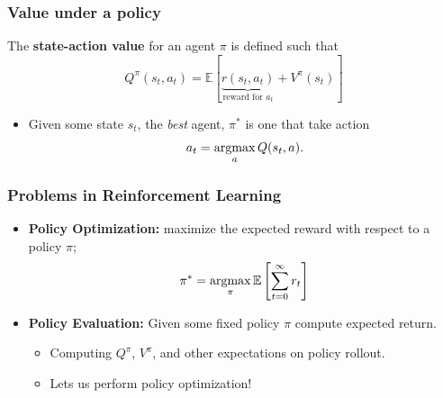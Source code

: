 \begin{frame}
\frametitle{Value under a policy}
  The \textbf{state-action value} for an agent $\pi$ is defined such that
  \begin{equation*}
    Q^\pi(s_t, a_t) = \mathbb{E}\left[\underbrace{r(s_t, a_t)}_{\text{reward for } a_t} + V^\pi(s_t)\right]
  \end{equation*}
  \begin{itemize}
    \item Given some state $s_t$, the \emph{best} agent, $\pi^*$ is one that take action 
  \begin{equation*}
    a_t = \mathop{\mathrm{argmax}}_a Q(s_t, a).   
  \end{equation*}
  \end{itemize}
\end{frame}

\begin{frame}
  \frametitle{Problems in Reinforcement Learning}
  \begin{itemize}
    \item \textbf{Policy Optimization:} maximize the expected reward with respect to a policy $\pi$;
    \begin{equation*}
      \pi^* = \mathop{\mathrm{argmax}}_\pi \mathbb{E}\left[\sum_{t=0}^\infty r_t \right]
    \end{equation*}
    \item \textbf{Policy Evaluation:} Given some fixed policy $\pi$ compute expected return.
    \begin{itemize}
      \item Computing $Q^{\pi}$, $V^{\pi}$, and other expectations on policy rollout.
      \item Lets us perform policy optimization!
    \end{itemize}
  \end{itemize}
\end{frame}
